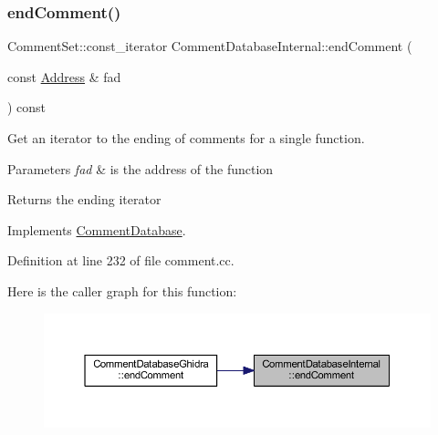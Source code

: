\subsubsection{\texorpdfstring{endComment()}{endComment()}}
{\footnotesize\ttfamily Comment\+Set\+::const\+\_\+iterator Comment\+Database\+Internal\+::end\+Comment (\begin{DoxyParamCaption}\item[{const \mbox{\hyperlink{class_address}{Address}} \&}]{fad }\end{DoxyParamCaption}) const\hspace{0.3cm}{\ttfamily [virtual]}}



Get an iterator to the ending of comments for a single function. 


\begin{DoxyParams}{Parameters}
{\em fad} & is the address of the function \\
\hline
\end{DoxyParams}
\begin{DoxyReturn}{Returns}
the ending iterator 
\end{DoxyReturn}


Implements \mbox{\hyperlink{class_comment_database_a51e0634dc24c921507426298910336f4}{Comment\+Database}}.



Definition at line 232 of file comment.\+cc.

Here is the caller graph for this function\+:
\nopagebreak
\begin{figure}[H]
\begin{center}
\leavevmode
\includegraphics[width=350pt]{class_comment_database_internal_a67ef8bcfd5778dd45acfd533ffd56189_icgraph}
\end{center}
\end{figure}
\mbox{\label{class_comment_database_internal_a461a9fbe7e898e251637bd605d5758e2}} 
